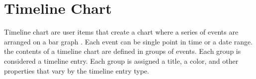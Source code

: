 \section{Timeline Chart} 
\hspace*{0.82cm}Timeline chart are user items that create a chart where a series of events are arranged on a bar graph . Each event 
can be single point in time or a date range. the contents of a timeline chart are defined in groups of events. Each group is 
considered a timeline entry. Each group is assigned a title, a color, and other properties that vary by the timeline entry type.

 




